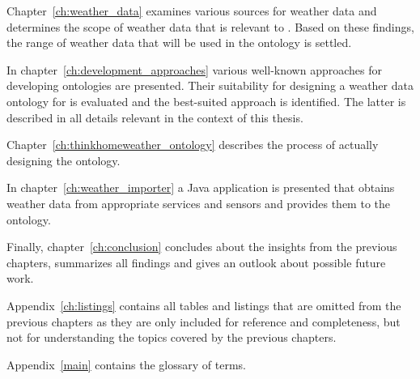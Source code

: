 Chapter~\ref{ch:weather_data} examines various sources for weather data and determines the scope of weather data that is relevant to \thinkhome. Based on these findings, the range of weather data that will be used in the ontology is settled.

In chapter~\ref{ch:development_approaches} various well-known approaches for developing ontologies are presented. Their suitability for designing a weather data ontology for \thinkhome is evaluated and the best-suited approach is identified. The latter is described in all details relevant in the context of this thesis.

Chapter~\ref{ch:thinkhomeweather_ontology} describes the process of actually designing the ontology.

In chapter~\ref{ch:weather_importer} a Java application is presented that obtains weather data from appropriate services and sensors and provides them to the \thinkhome ontology.

Finally, chapter~\ref{ch:conclusion} concludes about the insights from the previous chapters, summarizes all findings and gives an outlook about possible future work.

Appendix~\ref{ch:listings} contains all tables and listings that are omitted from the previous chapters as they are only included for reference and completeness, but not for understanding the topics covered by the previous chapters.

Appendix~\ref{main} contains the glossary of terms.
